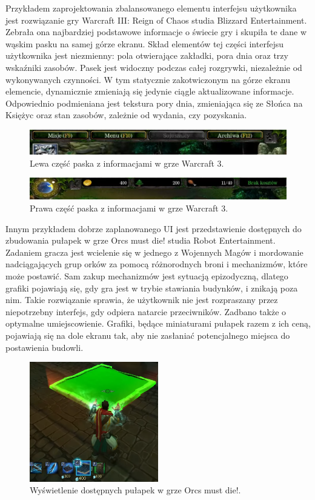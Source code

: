 Przykładem zaprojektowania zbalansowanego elementu interfejsu użytkownika jest rozwiązanie gry Warcraft III: Reign of Chaos studia Blizzard Entertainment.
Zebrała ona najbardziej podstawowe informacje o świecie gry i skupiła te dane w wąskim pasku na samej górze ekranu.
Skład elementów tej części interfejsu użytkownika jest niezmienny: pola otwierające zakładki, pora dnia oraz trzy wskaźniki zasobów. Pasek jest widoczny
podczas całej rozgrywki, niezależnie od wykonywanych czynności. W tym statycznie zakotwiczonym na górze ekranu elemencie, dynamicznie
zmieniają się jedynie ciągle aktualizowane informacje. Odpowiednio podmieniana jest tekstura pory dnia, zmieniająca się ze Słońca
na Księżyc oraz stan zasobów, zależnie od wydania, czy pozyskania.

\begin{figure}[htbp]
    \centering
    \includegraphics[width=1.0\textwidth]{images/ui/warcraft3_gorny_pasek_lewy.png}
    \caption{Lewa część paska z informacjami w grze Warcraft 3.}\label{fig:Warcraft3}
\end{figure}

\begin{figure}[htbp]
    \centering
    \includegraphics[width=1.0\textwidth]{images/ui/warcraft3_gorny_pasek_prawy.png}
    \caption{Prawa część paska z informacjami w grze Warcraft 3.}\label{fig:Warcraft3}
\end{figure}

Innym przykładem dobrze zaplanowanego UI jest przedstawienie dostępnych do zbudowania pułapek w grze
Orcs must die! studia Robot Entertainment. Zadaniem gracza jest wcielenie się w jednego z Wojennych Magów i mordowanie nadciągających grup orków za pomocą różnorodnych broni
i mechanizmów, które może postawić. Sam zakup mechanizmów jest sytuacją epizodyczną, dlatego grafiki pojawiają się, gdy gra jest w trybie stawiania budynków, 
i znikają poza nim. Takie rozwiązanie sprawia, że użytkownik nie jest rozpraszany przez niepotrzebny interfejs, gdy odpiera natarcie przeciwników. Zadbano także o
optymalne umiejscowienie. Grafiki, będące miniaturami pułapek razem z ich ceną, pojawiają się na dole ekranu tak, aby nie zasłaniać potencjalnego miejsca do postawienia budowli.

\begin{figure}[h!tbp]
    \centering
    \includegraphics[width=0.5\textwidth]{images/ui/buoildingsOrcs.png}
    \caption{Wyświetlenie dostępnych pułapek w grze Orcs must die!.}\label{fig:Orcs}
\end{figure}